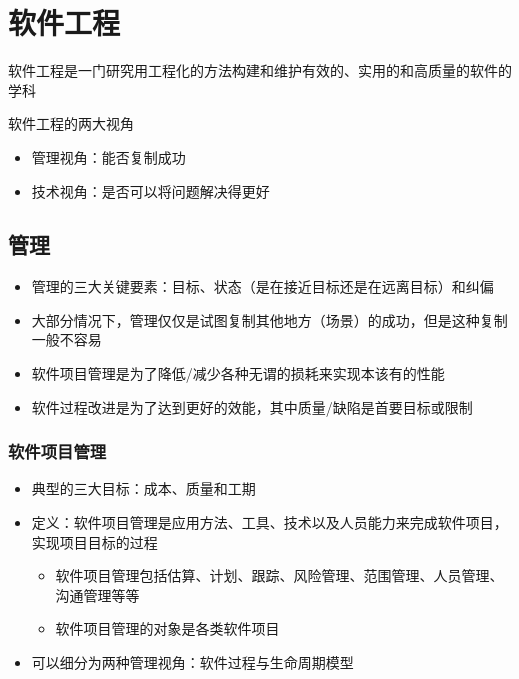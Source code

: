 \section{软件工程}
软件工程是一门研究用工程化的方法构建和维护有效的、实用的和高质量的软件的学科

软件工程的两大视角
\vspace{-0.8em}
\begin{multicols}{2}
    \begin{itemize}
        \item 管理视角：能否复制成功
        \item 技术视角：是否可以将问题解决得更好
    \end{itemize}
\end{multicols}
\vspace{-1em}


\subsection{管理}
\begin{itemize}
    \item 管理的三大关键要素：目标、状态（是在接近目标还是在远离目标）和纠偏
    \item 大部分情况下，管理仅仅是试图复制其他地方（场景）的成功，但是这种复制一般不容易
    \item 软件项目管理是为了降低/减少各种无谓的损耗来实现本该有的性能
    \item 软件过程改进是为了达到更好的效能，其中质量/缺陷是首要目标或限制
\end{itemize}

\subsubsection{软件项目管理}
\begin{itemize}
    \item 典型的三大目标：成本、质量和工期
    \item 定义：软件项目管理是应用方法、工具、技术以及人员能力来完成软件项目，实现项目目标的过程
    \begin{itemize}
        \item 软件项目管理包括估算、计划、跟踪、风险管理、范围管理、人员管理、沟通管理等等
        \item 软件项目管理的对象是各类软件项目
    \end{itemize}
    \item 可以细分为两种管理视角：软件过程与生命周期模型
\end{itemize}

